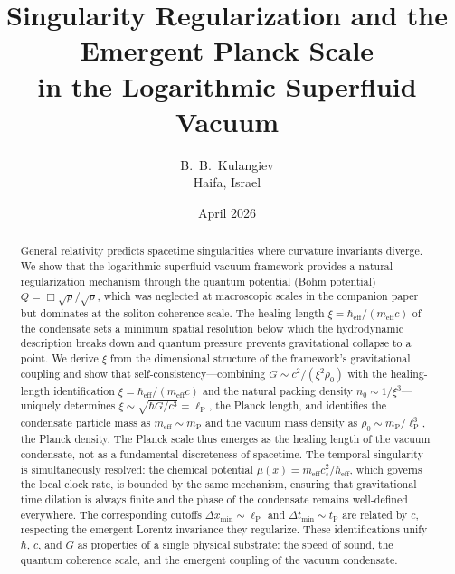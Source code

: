 \documentclass[12pt, a4paper]{article}
\newcommand{\meff}{m_{\mathrm{eff}}}
\newcommand{\heff}{\hbar_{\mathrm{eff}}}
\newcommand{\lP}{\ell_{\mathrm{P}}}
\newcommand{\mP}{m_{\mathrm{P}}}
\newcommand{\tP}{t_{\mathrm{P}}}
\begin{document}
\title{Singularity Regularization and the Emergent Planck Scale\\
in the Logarithmic Superfluid Vacuum}

\author{B.~B.~Kulangiev\\\small{Haifa, Israel}}
\date{April 2026}
\maketitle

\begin{abstract}
\noindent
General relativity predicts spacetime singularities where curvature invariants diverge. We show that the logarithmic superfluid vacuum framework provides a natural regularization mechanism through the quantum potential (Bohm potential) $Q = \Box\sqrt{\rho}/\sqrt{\rho}$, which was neglected at macroscopic scales in the companion paper but dominates at the soliton coherence scale. The healing length $\xi = \heff/(\meff c)$ of the condensate sets a minimum spatial resolution below which the hydrodynamic description breaks down and quantum pressure prevents gravitational collapse to a point. We derive $\xi$ from the dimensional structure of the framework's gravitational coupling and show that self-consistency---combining $G \sim c^2/(\xi^2\rho_0)$ with the healing-length identification $\xi = \heff/(\meff c)$ and the natural packing density $n_0 \sim 1/\xi^3$---uniquely determines $\xi \sim \sqrt{\hbar G/c^3} = \lP$, the Planck length, and identifies the condensate particle mass as $\meff \sim \mP$ and the vacuum mass density as $\rho_0 \sim \mP/\lP^3$, the Planck density. The Planck scale thus emerges as the healing length of the vacuum condensate, not as a fundamental discreteness of spacetime. The temporal singularity is simultaneously resolved: the chemical potential $\mu(x) = \meff c_s^2/\heff$, which governs the local clock rate, is bounded by the same mechanism, ensuring that gravitational time dilation is always finite and the phase of the condensate remains well-defined everywhere. The corresponding cutoffs $\Delta x_{\min} \sim \lP$ and $\Delta t_{\min} \sim \tP$ are related by $c$, respecting the emergent Lorentz invariance they regularize. These identifications unify $\hbar$, $c$, and $G$ as properties of a single physical substrate: the speed of sound, the quantum coherence scale, and the emergent coupling of the vacuum condensate.
\end{abstract}


\end{document}
